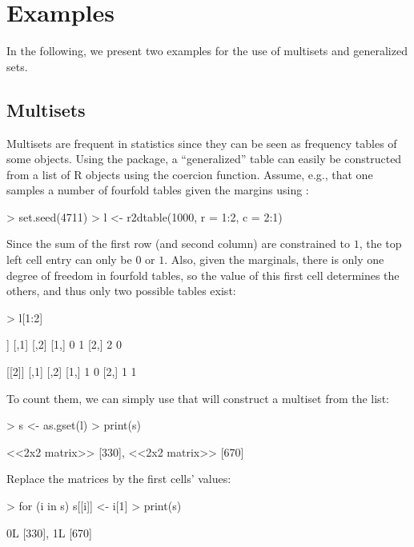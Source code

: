 \documentclass[article]{jss}
\newcommand\R{\textsf{R}}
\newcommand{\codefun}[1]{\code{#1()}}
\newcommand{\dQuote}[1]{``{#1}''}
\begin{document}
\section{Examples}
\label{sec:examples}

In the following, we present two examples for the use of multisets
and generalized sets.

\subsection{Multisets}

Multisets are frequent in statistics since they can be seen as
frequency tables of some objects. Using the  package, a
\dQuote{generalized} table can easily be constructed from a list of \R{}
objects using the \codefun{as.gset} coercion function. Assume, e.g., that one
samples a number of fourfold tables given the margins using \codefun{r2dtable}:
\begin{Schunk}
\begin{Sinput}
> set.seed(4711)
> l <- r2dtable(1000, r = 1:2, c = 2:1)
\end{Sinput}
\end{Schunk}
Since the sum of the first row (and second column) are constrained to
$1$, the top left cell entry can only be $0$ or $1$. Also, given the marginals,
there is only one degree of freedom in fourfold tables,
so the value of this first cell determines the others, and thus
only two possible tables exist:
\begin{Schunk}
\begin{Sinput}
> l[1:2]
\end{Sinput}
\begin{Soutput}
[[1]]
     [,1] [,2]
[1,]    0    1
[2,]    2    0

[[2]]
     [,1] [,2]
[1,]    1    0
[2,]    1    1
\end{Soutput}
\end{Schunk}
To count them, we can simply use \codefun{as.gset} that will construct a
multiset from the list:
\begin{Schunk}
\begin{Sinput}
> s <- as.gset(l)
> print(s)
\end{Sinput}
\begin{Soutput}
{<<2x2 matrix>> [330], <<2x2 matrix>> [670]}
\end{Soutput}
\end{Schunk}
Replace the matrices by the first cells' values:
\begin{Schunk}
\begin{Sinput}
> for (i in s) s[[i]] <- i[1]
> print(s)
\end{Sinput}
\begin{Soutput}
{0L [330], 1L [670]}
\end{Soutput}
\end{Schunk}
\end{document}
